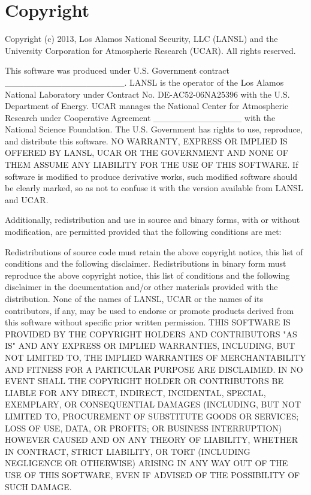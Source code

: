 \chapter*{Copyright}
\label{chap:copyright}

Copyright (c) 2013,  Los Alamos National Security, LLC (LANSL) and the University Corporation for Atmospheric Research (UCAR).   
All rights reserved. 

This software was produced under U.S. Government contract ___________________. LANSL is the operator of the Los Alamos National Laboratory under Contract No. DE-AC52-06NA25396 with the U.S. Department of Energy.  UCAR manages the National Center for Atmospheric Research under Cooperative Agreement ______________ with the National Science Foundation.  The U.S. Government has rights to use, reproduce, and distribute this software.  NO WARRANTY, EXPRESS OR IMPLIED IS OFFERED BY LANSL, UCAR OR THE GOVERNMENT AND NONE OF THEM ASSUME ANY LIABILITY FOR THE USE OF THIS SOFTWARE.  If software is modified to produce derivative works, such modified software should be clearly marked, so as not to confuse it with the version available from LANSL and UCAR.

Additionally, redistribution and use in source and binary forms, with or without modification, are permitted provided that the following conditions are met:

Redistributions of source code must retain the above copyright notice, this list of conditions and the following disclaimer.
Redistributions in binary form must reproduce the above copyright notice, this list of conditions and the following disclaimer in the documentation and/or other materials provided with the distribution.
None of the names of LANSL, UCAR or the names of its contributors, if any, may be used to endorse or promote products derived from this software without specific prior written permission.
THIS SOFTWARE IS PROVIDED BY THE COPYRIGHT HOLDERS AND CONTRIBUTORS "AS IS" AND ANY EXPRESS OR IMPLIED WARRANTIES, INCLUDING, BUT NOT LIMITED TO, THE IMPLIED WARRANTIES OF MERCHANTABILITY AND FITNESS FOR A PARTICULAR PURPOSE ARE DISCLAIMED. IN NO EVENT SHALL THE COPYRIGHT HOLDER OR CONTRIBUTORS BE LIABLE FOR ANY DIRECT, INDIRECT, INCIDENTAL, SPECIAL, EXEMPLARY, OR CONSEQUENTIAL DAMAGES (INCLUDING, BUT NOT LIMITED TO, PROCUREMENT OF SUBSTITUTE GOODS OR SERVICES; LOSS OF USE, DATA, OR PROFITS; OR BUSINESS INTERRUPTION) HOWEVER CAUSED AND ON ANY THEORY OF LIABILITY, WHETHER IN CONTRACT, STRICT LIABILITY, OR TORT (INCLUDING NEGLIGENCE OR OTHERWISE) ARISING IN ANY WAY OUT OF THE USE OF THIS SOFTWARE, EVEN IF ADVISED OF THE POSSIBILITY OF SUCH DAMAGE.

\newpage
